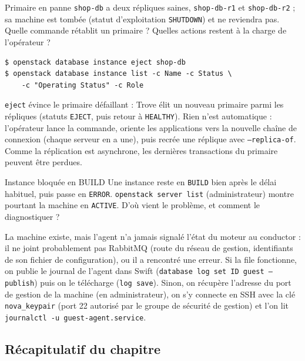 \begin{exercice}{Primaire en panne}\label{ex:tr-bascule}
\texttt{shop-db} a deux répliques saines, \texttt{shop-db-r1} et \texttt{shop-db-r2} ; sa machine est tombée (statut d'exploitation
\texttt{SHUTDOWN}) et ne reviendra pas. Quelle commande rétablit un primaire ? Quelles actions restent à la charge de l'opérateur ?
\end{exercice}
\begin{correction}
\begin{lstlisting}
$ openstack database instance eject shop-db
$ openstack database instance list -c Name -c Status \
    -c "Operating Status" -c Role
\end{lstlisting}
\texttt{eject} évince le primaire défaillant : Trove élit un nouveau primaire parmi les répliques (statuts \texttt{EJECT}, puis retour à
\texttt{HEALTHY}). Rien n'est automatique : l'opérateur lance la commande, oriente les applications vers la nouvelle chaîne de connexion
(chaque serveur en a une), puis recrée une réplique avec \texttt{--replica-of}. Comme la réplication est asynchrone, les dernières
transactions du primaire peuvent être perdues.
\end{correction}

\begin{exercice}{Instance bloquée en BUILD}\label{ex:tr-build}
Une instance reste en \texttt{BUILD} bien après le délai habituel, puis passe en \texttt{ERROR}. \texttt{openstack server list} (administrateur)
montre pourtant la machine en \texttt{ACTIVE}. D'où vient le problème, et comment le diagnostiquer ?
\end{exercice}
\begin{correction}
La machine existe, mais l'agent n'a jamais signalé l'état du moteur au conductor : il ne joint probablement pas RabbitMQ (route du réseau de
gestion, identifiants de son fichier de configuration), ou il a rencontré une erreur. Si la file fonctionne, on publie le journal de
l'agent dans Swift (\texttt{database log set ID guest --publish}) puis on le télécharge (\texttt{log save}). Sinon, on récupère
l'adresse du port de gestion de la machine (en administrateur), on s'y connecte en SSH avec la clé \texttt{nova\_keypair} (port 22 autorisé par
le groupe de sécurité de gestion) et l'on lit \texttt{journalctl -u guest-agent.service}.
\end{correction}

\subsection{Récapitulatif du chapitre}\label{sec:tr-recap}

